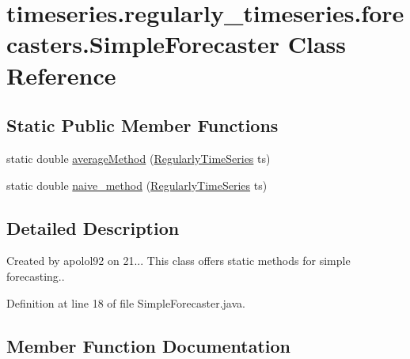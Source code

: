 \hypertarget{classtimeseries_1_1regularly__timeseries_1_1forecasters_1_1_simple_forecaster}{}\section{timeseries.\+regularly\+\_\+timeseries.\+forecasters.\+Simple\+Forecaster Class Reference}
\label{classtimeseries_1_1regularly__timeseries_1_1forecasters_1_1_simple_forecaster}
\subsection*{Static Public Member Functions}
\begin{DoxyCompactItemize}
\item 
static double \hyperlink{classtimeseries_1_1regularly__timeseries_1_1forecasters_1_1_simple_forecaster_a84564c513ad7970d9cc1b6619b462023}{average\+Method} (\hyperlink{classtimeseries_1_1_regularly_time_series}{Regularly\+Time\+Series} ts)
\item 
static double \hyperlink{classtimeseries_1_1regularly__timeseries_1_1forecasters_1_1_simple_forecaster_aff68d3d40969d8564dc5c0c60b4df361}{naive\+\_\+method} (\hyperlink{classtimeseries_1_1_regularly_time_series}{Regularly\+Time\+Series} ts)
\end{DoxyCompactItemize}


\subsection{Detailed Description}
Created by apolol92 on 21... This class offers static methods for simple forecasting.. 

Definition at line 18 of file Simple\+Forecaster.\+java.



\subsection{Member Function Documentation}
\hypertarget{classtimeseries_1_1regularly__timeseries_1_1forecasters_1_1_simple_forecaster_a84564c513ad7970d9cc1b6619b462023}{}
